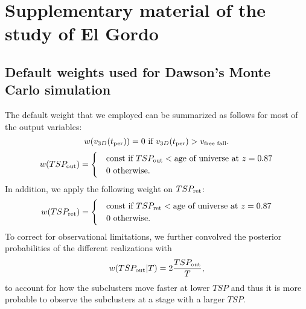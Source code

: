 
\doublespacing
\chapter{Supplementary material of the study of El Gordo}{}{}
\label{appendix1}

				 

\section{Default weights used for Dawson's Monte Carlo simulation}
\label{app:priors}
The default weight that we employed can be summarized as
follows for most of the output variables: 
\begin{equation}
	w(v_{3D}(t_{\rm per})) = 0\text{ if }v_{3D}(t_{\rm per}) >
	v_{\text{free fall}}. 
\end{equation}
\begin{equation}
	w(TSP_{\rm out}) = 
	\begin{cases}
		& \text{const}~\text{if }TSP_{\rm out} < \text{age of universe at } z=0.87	\\
		& 0~\text{otherwise}.
	\end{cases}
\end{equation}
In addition, we apply the following weight on $TSP_{\rm ret}$:
\begin{equation}
	w(TSP_{\rm ret}) = 
	\begin{cases}
		& \text{const}~\text{if }TSP_{\rm ret} < \text{age of universe at } z=0.87	\\
		& 0~\text{otherwise} \label{eqn:TSM_1}.
	\end{cases}
\end{equation}
To correct for observational limitations, we further convolved the
posterior probabilities of the different realizations with 
\begin{equation}
	w(TSP_{\rm out} | T) = 2 \frac{TSP_{\rm out}}{T},
\end{equation}
to account for how the subclusters move faster at lower $TSP$ and thus it
is more probable to observe the subclusters at a stage with a larger $TSP$.
\par 
